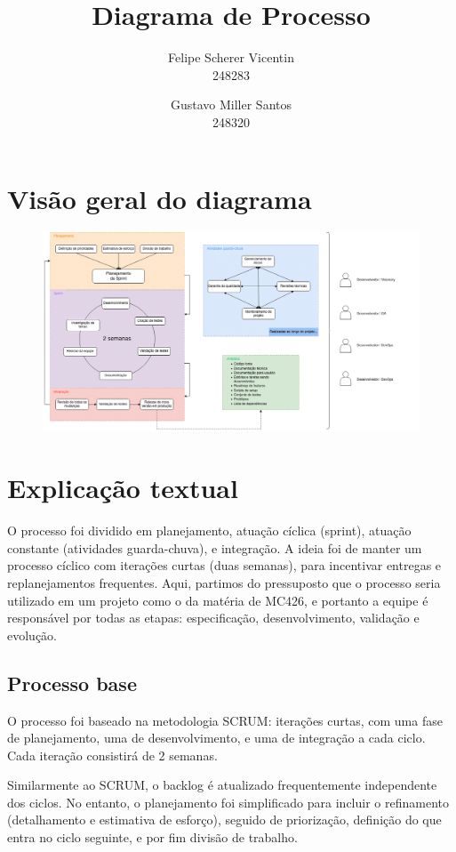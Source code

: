 \documentclass[12pt]{article}
\author{
	Felipe Scherer Vicentin\\
	248283
	\and
	Gustavo Miller Santos\\
	248320
}
\title{Diagrama de Processo}
\begin{document}
\maketitle

\section*{Visão geral do diagrama}

\begin{figure}[H]
	\centering
	\includegraphics[width=\linewidth]{images/process_diagram.png}
\end{figure}

\section*{Explicação textual}

O processo foi dividido em planejamento, atuação cíclica (sprint), atuação constante (atividades guarda-chuva), e integração. A ideia foi de manter um processo cíclico com iterações curtas (duas semanas), para
incentivar entregas e replanejamentos frequentes. Aqui, partimos do pressuposto que o processo seria utilizado em um projeto como o da matéria de MC426, e portanto a equipe é responsável por todas
as etapas: especificação, desenvolvimento, validação e evolução.

\subsection*{Processo base}

O processo foi baseado na metodologia SCRUM: iterações curtas, com uma fase de planejamento, uma de desenvolvimento, e uma de integração a cada ciclo. Cada iteração consistirá de 2 semanas.

Similarmente ao SCRUM, o backlog é atualizado frequentemente independente dos ciclos. No entanto, o planejamento foi simplificado para incluir o refinamento (detalhamento e estimativa de esforço),
seguido de priorização, definição do que entra no ciclo seguinte, e por fim divisão de trabalho.
\end{document}

